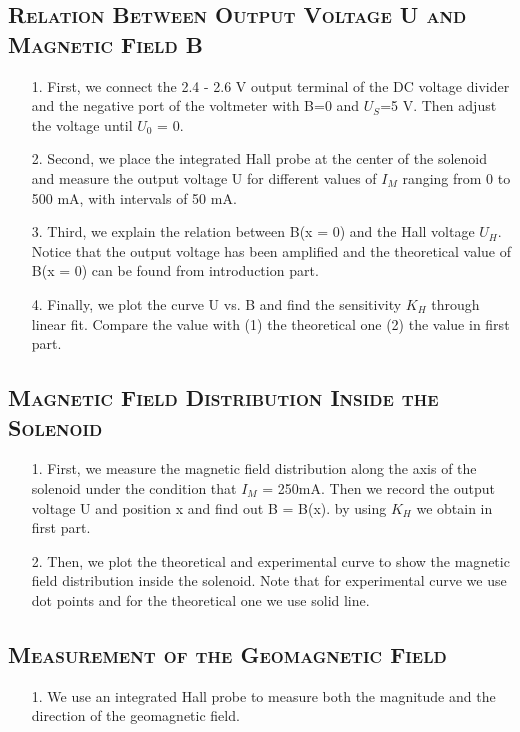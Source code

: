\documentclass[a4paper,12pt]{article}
\begin{document}
\subsection{\textsc{Relation Between Output Voltage U and Magnetic Field B}}
\begin{itemize}
\item[1.] First, we connect the 2.4 - 2.6 V output terminal of the DC voltage divider and the negative port of the voltmeter with B=0 and $U_S$=5 V. Then adjust the voltage until $U_0$ = 0.
\item[2.] Second, we place the integrated Hall probe at the center of the solenoid and measure the output voltage U for different values of $I_M$ ranging from 0 to 500 mA, with intervals of 50 mA.
\item[3.] Third, we explain the relation between B(x = 0) and the Hall voltage $U_H$. Notice that the output voltage has been amplified and the theoretical value of B(x = 0) can be found from introduction part.
\item[4.] Finally, we plot the curve U vs. B and find the sensitivity $K_H$ through linear fit. Compare the value with (1) the theoretical one (2) the value in first part.
\end{itemize}

\subsection{\textsc{Magnetic Field Distribution Inside the Solenoid}}
\begin{itemize}
\item[1.] First, we measure the magnetic field distribution along the axis of the solenoid under the condition that $I_M$ = 250mA. Then we record the output voltage U and position x and find out B = B(x). by using $K_H$ we obtain in first part.
\item[2.] Then, we plot the theoretical and experimental curve to show the magnetic field distribution inside the solenoid. Note that for experimental curve we use dot points and for the theoretical one we use solid line.
\end{itemize}

\subsection{\textsc{Measurement of the Geomagnetic Field}}
\begin{itemize}
\item[1.] We use an integrated Hall probe to measure both the magnitude and the direction of the geomagnetic field.
\end{itemize}
\end{document}

